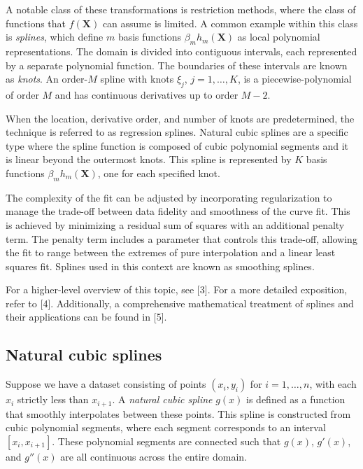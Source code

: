 \documentclass[
11pt, %
oneside, %
english, %
singlespacing, %
]{macthesis} %
\begin{document}
A notable class of these transformations is restriction methods, where the class of functions that \(f(\mathbf{X})\) can assume is limited. A common example within this class is \emph{splines}, which define \(m\) basis functions \(\beta_m h_m(\mathbf{X})\) as local polynomial representations. The domain is divided into contiguous intervals, each represented by a separate polynomial function. The boundaries of these intervals are known as \emph{knots}. An order-\(M\) spline with knots \(\xi_j\), \(j = 1,\dots, K\), is a piecewise-polynomial of order \(M\) and has continuous derivatives up to order \(M-2\).

When the location, derivative order, and number of knots are predetermined, the technique is referred to as regression splines. Natural cubic splines are a specific type where the spline function is composed of cubic polynomial segments and it is linear beyond the outermost knots. This spline is represented by \(K\) basis functions \(\beta_m h_m(\mathbf{X})\), one for each specified knot.

The complexity of the fit can be adjusted by incorporating regularization to manage the trade-off between data fidelity and smoothness of the curve fit. This is achieved by minimizing a residual sum of squares with an additional penalty term. The penalty term includes a parameter that controls this trade-off, allowing the fit to range between the extremes of pure interpolation and a linear least squares fit. Splines used in this context are known as smoothing splines.

For a higher-level overview of this topic, see {[}3{]}. For a more detailed exposition, refer to {[}4{]}. Additionally, a comprehensive mathematical treatment of splines and their applications can be found in {[}5{]}.

\subsection{Natural cubic splines}\label{Natural-cubic-splines}

Suppose we have a dataset consisting of points \((x_i, y_i)\) for \(i = 1, \ldots, n\), with each \(x_i\) strictly less than \(x_{i+1}\). A \emph{natural cubic spline} \(g(x)\) is defined as a function that smoothly interpolates between these points. This spline is constructed from cubic polynomial segments, where each segment corresponds to an interval \([x_i, x_{i+1}]\). These polynomial segments are connected such that \(g(x)\), \(g'(x)\), and \(g''(x)\) are all continuous across the entire domain.
\end{document}
